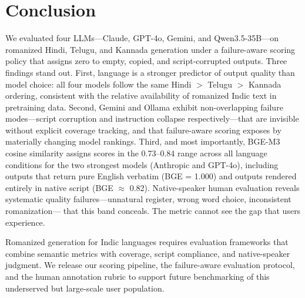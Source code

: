 \section{Conclusion}

We evaluated four LLMs---Claude, GPT-4o, Gemini, and Qwen3.5-35B---on
romanized Hindi, Telugu, and Kannada generation under a failure-aware scoring
policy that assigns zero to empty, copied, and script-corrupted outputs. Three
findings stand out. First, language is a stronger predictor of output quality
than model choice: all four models follow the same Hindi $>$ Telugu $>$ Kannada
ordering, consistent with the relative availability of romanized Indic text in
pretraining data. Second, Gemini and Ollama exhibit non-overlapping failure
modes---script corruption and instruction collapse respectively---that are
invisible without explicit coverage tracking, and that failure-aware scoring
exposes by materially changing model rankings. Third, and most importantly,
BGE-M3 cosine similarity assigns scores in the 0.73--0.84 range across all
language conditions for the two strongest models (Anthropic and GPT-4o),
including outputs that return pure English verbatim (BGE = 1.000) and outputs
rendered entirely in native script (BGE $\approx$ 0.82). Native-speaker human evaluation reveals systematic quality
failures---unnatural register, wrong word choice, inconsistent romanization---
that this band conceals. The metric cannot see the gap that users experience.

Romanized generation for Indic languages requires evaluation frameworks that
combine semantic metrics with coverage, script compliance, and native-speaker
judgment. We release our scoring pipeline, the failure-aware evaluation
protocol, and the human annotation rubric to support future benchmarking of
this underserved but large-scale user population.
